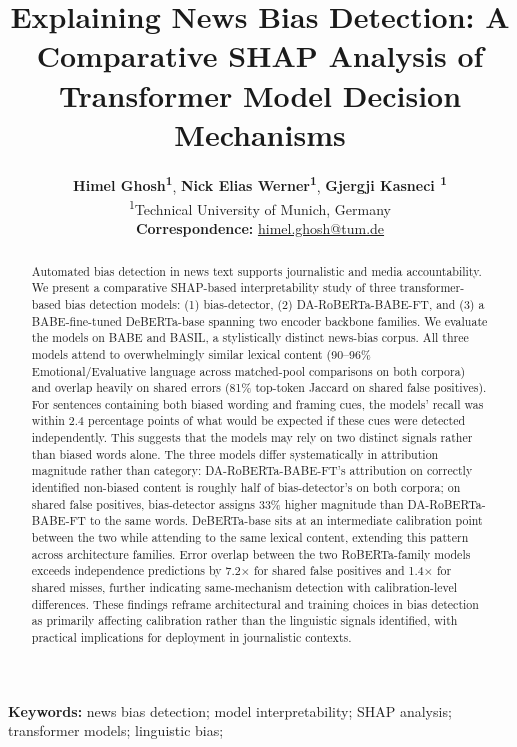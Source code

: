 \documentclass[11pt]{article}
\title{Explaining News Bias Detection: A Comparative SHAP Analysis of Transformer Model Decision Mechanisms}
\author{
  \textbf{Himel Ghosh\textsuperscript{1}},
  \textbf{Nick Elias Werner\textsuperscript{1}},
  \textbf{Gjergji Kasneci \textsuperscript{1}}
  \\
  \textsuperscript{1}Technical University of Munich, Germany
  \\
  \small{
    \textbf{Correspondence:} \href{mailto:himel.ghosh@tum.de}{himel.ghosh@tum.de}
  }
}
\begin{document}
\maketitle
\begin{abstract}
Automated bias detection in news text supports journalistic and media accountability. We present a comparative SHAP-based interpretability study of three transformer-based bias detection 
models: (1) bias-detector, (2) DA-RoBERTa-BABE-FT, and (3) a BABE-fine-tuned DeBERTa-base spanning two encoder backbone families. We evaluate the models on BABE and BASIL, a stylistically distinct news-bias corpus. All three models attend to overwhelmingly similar lexical content (90--96\% Emotional/Evaluative language across matched-pool comparisons on both corpora) and overlap heavily on shared errors (81\% top-token Jaccard on shared false positives). For sentences containing both biased wording and framing cues, the models’ recall was within 2.4 percentage points of what would be expected if these cues were detected independently. This suggests that the models may rely on two distinct signals rather than biased words alone. The three models differ systematically in attribution magnitude rather than category: 
DA-RoBERTa-BABE-FT's attribution on correctly identified non-biased content is roughly half of bias-detector's on both corpora; on shared false positives, bias-detector assigns 33\% higher magnitude 
than DA-RoBERTa-BABE-FT to the same words. DeBERTa-base sits at an intermediate calibration point 
between the two while attending to the same lexical content, extending this pattern across architecture families. Error overlap between the two RoBERTa-family models exceeds independence predictions by 7.2$\times$ for shared false positives 
and 1.4$\times$ for shared misses, further indicating same-mechanism 
detection with calibration-level differences. These findings reframe 
architectural and training choices in bias detection as primarily 
affecting calibration rather than the linguistic signals identified, 
with practical implications for deployment in journalistic contexts.
\end{abstract}
\textbf{Keywords:} news bias detection; model interpretability;
SHAP analysis; transformer models; linguistic bias;
\end{document}
